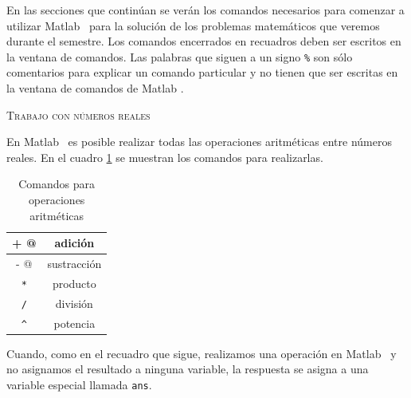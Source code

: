 \documentclass[letter,11pt]{article}
\newcommand\0{\mathbf{0}}
\newcommand{\matlab}{{\sc Matlab }}
\begin{document}
% 		
		





En las secciones que contin\'uan se ver\'an los comandos necesarios para comenzar a utilizar \matlab\,
para la soluci\'on de los problemas matem\'aticos que veremos durante el semestre.
Los comandos encerrados en recuadros deben ser escritos en la ventana de comandos.
Las palabras que siguen a un signo \texttt{\%} son s\'olo comentarios
para explicar un comando particular y no tienen que ser escritas en la ventana de comandos de \matlab.

\bigskip
\centerline{\textsc{Trabajo con n\'umeros reales}}
\medskip

	En \matlab\, es posible realizar todas las operaciones aritm\'eticas entre n\'umeros reales.
	En el cuadro \ref{table:operaciones} se muestran los comandos para realizarlas.

	\begin{table}[ht]
\begin{center}
		\begin{tabular}{|c|c|}\hline
			\verb@ + @ & adici\'on\\\hline
			\verb@ - @ & sustracci\'on\\\hline
			\verb+ * + & producto\\\hline
			\verb+ / + & divisi\'on\\\hline
			\verb+ ^ + & potencia\\\hline
		\end{tabular}
\end{center}
		\caption{Comandos para operaciones aritm\'eticas}\label{table:operaciones}
	\end{table}

	Cuando, como en el recuadro que sigue, realizamos una operaci\'on en \matlab\, y no asignamos el resultado a ninguna variable, la respuesta se asigna a una variable especial llamada \verb+ans+.
\end{document}
